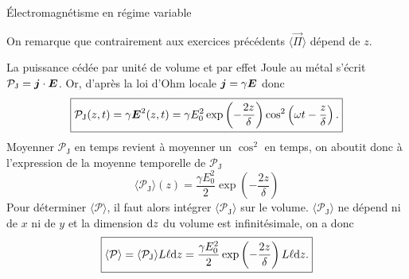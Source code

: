 \begin{corr}{Électromagnétisme en régime variable}
\begin{corrlist}
\begin{equation*}
{	   }
   	   \end{equation*}
	   On remarque que contrairement aux exercices précédents $\langle 
	   \vec{\Pi} \rangle$ dépend de $z$.
	   \item La puissance cédée par unité de volume et par effet Joule au métal
		 s'écrit $\mathcal{P}_\mathrm{J} = \vecj \cdot \vece$. Or, 
		 d'après la loi d'Ohm locale $\vecj = \gamma \vece$ donc
		 \begin{equation*}
			 \boxed{
				 \mathcal{P}_\mathrm{J}(z,t) = \gamma \vece^2(z,t)
			 = \gamma E_0^2 \exp\left(-\dfrac{2z}{\delta}\right)
			   \cos^2\left(\omega t - \dfrac{z}{\delta}\right).
		   }
	 	 \end{equation*}
		 Moyenner $\mathcal{P}_\mathrm{J}$ en temps revient à moyenner
		 un $\cos^2$ en temps, on aboutit donc à l'expression de la 
		 moyenne temporelle de $\mathcal{P}_\mathrm{J}$
		 \begin{equation*}
			 \boxed{
				 \langle \mathcal{P}_\mathrm{J} \rangle(z) = 
				\dfrac{\gamma E_0^2}{2}\exp
				\left(-\dfrac{2z}{\delta}\right)
			}
		\end{equation*}
		Pour déterminer $\langle \mathcal{P} \rangle$, il faut alors intégrer 
		$\langle \mathcal{P}_\mathrm{J} \rangle$ sur le volume. 
		$\langle \mathcal{P}_\mathrm{J} \rangle$ ne dépend ni de $x$
		ni de $y$ et la dimension $\mathrm{d}z$ du volume est infinitésimale, 
		on a donc
		\begin{equation*}
			\boxed{
				\langle \mathcal{P} \rangle = \langle 
				\mathcal{P}_\mathrm{J} \rangle
				L \ell \mathrm{d}z
				=\dfrac{\gamma E_0^2}{2} 
		      \exp\left(-\dfrac{2z}{\delta}\right) L \ell \mathrm{d}z.
		}
		\end{equation*}


\end{corrlist}
\end{corr}
